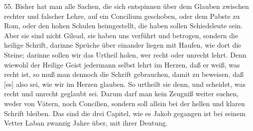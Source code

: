 55. Bisher hat man alle Sachen, die sich entspinnen über dem Glauben zwischen rechter und falscher Lehre, auf ein Concilium geschoben, oder dem Pabste zu Rom, oder den hohen Schulen heimgestellt, die haben sollen Schiedsleute sein. Aber sie sind nicht Gilead, sie haben uns verführt und betrogen, sondern die heilige Schrift, darinne Sprüche über einander liegen mit Haufen, wie dort die Steine; darinne sollen wir das Urtheil holen, wer recht oder unrecht lehrt. Denn wiewohl der Heilige Geist jedermann selbst lehrt im Herzen, daß er weiß, was recht ist, so muß man dennoch die Schrift gebrauchen, damit zu beweisen, daß [es] also sei, wie wir im Herzen glauben. So urtheilt sie denn, und scheidet, was recht und unrecht geglaubt sei. Darum darf man kein Zeugniß weiter suchen, weder von Vätern, noch Concilien, sondern soll allein bei der hellen und klaren Schrift bleiben. Das sind die drei Capitel, wie es Jakob gegangen ist bei seinem Vetter Laban zwanzig Jahre über, mit ihrer Deutung.

